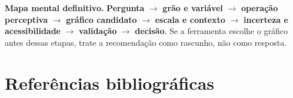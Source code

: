 \begin{SummaryBox}
\textbf{Mapa mental definitivo.} \textbf{Pergunta} $\rightarrow$ \textbf{grão e variável} $\rightarrow$ \textbf{operação perceptiva} $\rightarrow$ \textbf{gráfico candidato} $\rightarrow$ \textbf{escala e contexto} $\rightarrow$ \textbf{incerteza e acessibilidade} $\rightarrow$ \textbf{validação} $\rightarrow$ \textbf{decisão}. Se a ferramenta escolhe o gráfico antes dessas etapas, trate a recomendação como rascunho, não como resposta.
\end{SummaryBox}




\clearpage
\section*{Referências bibliográficas}
